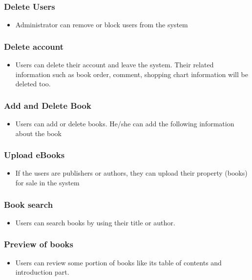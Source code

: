 	\subsubsection{Delete Users}
	\begin{itemize}
		\item Administrator can remove or block users from the system
	\end{itemize}

	\subsubsection{Delete account}
	\begin{itemize}
		\item Users can delete their account and leave the system. Their related information such as book order, comment, shopping chart information will be deleted too.
	\end{itemize}

	\subsubsection{Add and Delete Book}
	\begin{itemize}
		\item Users can add or delete books. He/she can add the following information about the book
	\end{itemize}

	\subsubsection{Upload eBooks}
	\begin{itemize}
		\item If the users are publishers or authors, they can upload their property (books) for sale in the system
	\end{itemize}

	\subsubsection{Book search}
	\begin{itemize}
		\item Users can search books by using their title or author.
	\end{itemize}

	\subsubsection{Preview of books}
	\begin{itemize}
		\item Users can review some portion of books like its table of contents and introduction part.
	\end{itemize}


